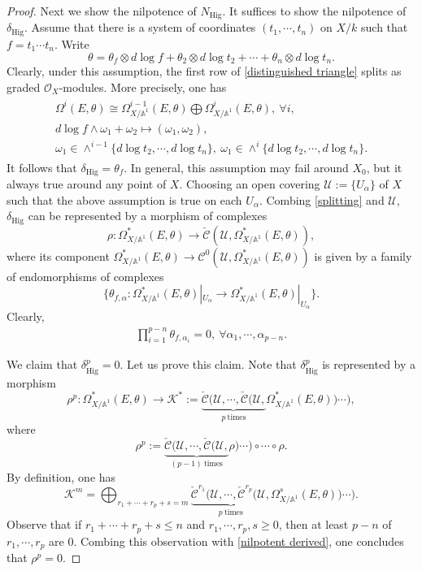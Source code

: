 \documentclass[12pt, a4paper]{article}
\begin{document}
\begin{proof}
Next we show the nilpotence of $N_\mathrm{Hig}$. It suffices to show the nilpotence of $\delta_\mathrm{Hig}$.
Assume that there is a system of coordinates $(t_1,\cdots,t_n)$ on $X/k$ such that $f=t_1\cdots t_n$. Write 
$$
\theta=\theta_f\otimes d\log f+\theta_2\otimes d\log t_2+\cdots+\theta_n\otimes d\log t_n.
$$
Clearly, under this assumption, the first row of \eqref{distinguished triangle} splits as graded $\mathcal O_X$-modules. More precisely, one has
\begin{eqnarray}\label{splitting}
\begin{array}{c}
\Omega^i(E,\theta)\cong\Omega^{i-1}_{X/\mathbb A^1}(E,\theta)\bigoplus\Omega^i_{X/\mathbb A^1}(E,\theta),~\forall i,\\
d\log f\wedge\omega_1+\omega_2\mapsto(\omega_1,\omega_2),\\
\omega_1\in\wedge^{i-1}\{d\log t_2,\cdots,d\log t_n\},~\omega_1\in\wedge^i\{d\log t_2,\cdots,d\log t_n\}.
\end{array}
\end{eqnarray}
It follows that $\delta_\mathrm{Hig}=\theta_f$. In general, this assumption may fail around $X_0$, but it always true around any point of $X$. Choosing an open covering    $\mathcal U:=\{U_\alpha\}$ of $X$ such that the above assumption is true on each $U_\alpha$. Combing \eqref{splitting} and $\mathcal U$, $\delta_\mathrm{Hig}$ can be represented by a morphism of complexes
$$
\rho:\Omega^*_{X/\mathbb A^1}(E,\theta)\to\check{\mathcal C}(\mathcal U,\Omega^*_{X/\mathbb A^1}(E,\theta)),
$$
where its component $\Omega^*_{X/\mathbb A^1}(E,\theta)\to\mathcal C^0(\mathcal U,\Omega^*_{X/\mathbb A^1}(E,\theta))$ is given by a family of endomorphisms of complexes
$$
\{
\theta_{f,\alpha}:\Omega^*_{X/\mathbb A^1}(E,\theta)|_{U_\alpha}\to\Omega^*_{X/\mathbb A^1}(E,\theta)|_{U_\alpha}
\}.
$$
Clearly, 
\begin{eqnarray}\label{nilpotent derived}
\prod_{i=1}^{p-n}\theta_{f,\alpha_i}=0,~\forall \alpha_1,\cdots,\alpha_{p-n}.
\end{eqnarray}

We claim that $\delta_\mathrm{Hig}^p=0$. Let us prove this claim. Note that $\delta^p_\mathrm{Hig}$ is represented by a morphism 
$$
\rho^p:\Omega^*_{X/\mathbb A^1}(E,\theta)\to\mathcal K^*:=\underbrace{\check{\mathcal C}(\mathcal U,\cdots,\check{\mathcal C}(\mathcal U,}_{p~\mathrm{times}}\Omega^*_{X/\mathbb A^1}(E,\theta))\cdots),$$
where 
$$\rho^p:=\underbrace{\check{\mathcal C}(\mathcal U,\cdots,\check{\mathcal C}(\mathcal U,}_{(p-1)~\mathrm{times}}\rho)\cdots)\circ\cdots\circ\rho.$$
By definition, one has
$$
\mathcal K^m=\bigoplus_{r_1+\cdots+r_p+s=m}\underbrace{\check{\mathcal C}^{r_1}(\mathcal U,\cdots,\check{\mathcal C}^{r_p}(\mathcal U,}_{p~\mathrm{times}}\Omega^s_{X/\mathbb A^1}(E,\theta))\cdots).$$
Observe that if $r_1+\cdots+r_p+s\leq n$ and $r_1,\cdots,r_p,s\geq0$, then at least $p-n$ of $r_1,\cdots,r_p$ are $0$. Combing this observation with \eqref{nilpotent derived}, one concludes that $\rho^p=0$. 


\end{proof}
\end{document}
